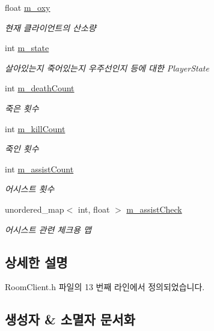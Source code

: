 \begin{DoxyCompactItemize}
float \hyperlink{class_room_client_a8c0bd64aa8b2d03f23b9a1ab5c2c2c1a}{m\+\_\+oxy}
\begin{DoxyCompactList}\small\item\em 현재 클라이언트의 산소량 \end{DoxyCompactList}\item 
int \hyperlink{class_room_client_a247e5deb46a11e0d1a0e8e9029d87d54}{m\+\_\+state}
\begin{DoxyCompactList}\small\item\em 살아있는지 죽어있는지 우주선인지 등에 대한 Player\+State \end{DoxyCompactList}\item 
int \hyperlink{class_room_client_a4427d3725926876237d44ae4b088c57f}{m\+\_\+death\+Count}
\begin{DoxyCompactList}\small\item\em 죽은 횟수 \end{DoxyCompactList}\item 
int \hyperlink{class_room_client_a221340e3b573d5b8e3c09fcc16bbb01b}{m\+\_\+kill\+Count}
\begin{DoxyCompactList}\small\item\em 죽인 횟수 \end{DoxyCompactList}\item 
int \hyperlink{class_room_client_adacb97c1fec85cb0efef063dc43073f5}{m\+\_\+assist\+Count}
\begin{DoxyCompactList}\small\item\em 어시스트 횟수 \end{DoxyCompactList}\item 
unordered\+\_\+map$<$ int, float $>$ \hyperlink{class_room_client_a9f63a98f8a902a52bf272f23af3e5f82}{m\+\_\+assist\+Check}
\begin{DoxyCompactList}\small\item\em 어시스트 관련 체크용 맵 \end{DoxyCompactList}\end{DoxyCompactItemize}


\subsection{상세한 설명}


Room\+Client.\+h 파일의 13 번째 라인에서 정의되었습니다.



\subsection{생성자 \& 소멸자 문서화}
\mbox{\label{class_room_client_a2cc526d1912c14c38858f07e5bac880d}} 
